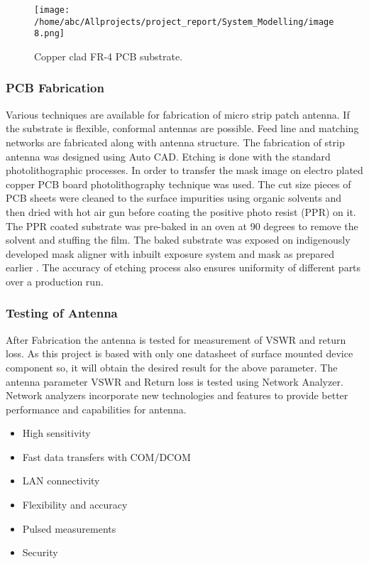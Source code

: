 \documentclass[12pt]{article}
\begin{document}
		            \begin{figure}[H]
		            	\centering
		            	\texttt{[image: /home/abc/Allprojects/project\_report/System\_Modelling/image8.png]}
		            	\caption{Copper clad FR-4 PCB substrate.}	             	
		            \end{figure}
		             		   
	
		        \subsubsection{PCB Fabrication}
		         \justify
		          Various techniques are available for fabrication of micro strip patch antenna. If the substrate is flexible, conformal antennas are possible. Feed line and matching networks are fabricated along with antenna structure. The fabrication of strip antenna was designed using Auto CAD. Etching is done with the standard photolithographic processes. In order to transfer the mask image on electro plated copper PCB board photolithography technique was used. The cut size pieces of PCB sheets were cleaned to the surface impurities using organic solvents and then dried with hot air gun before coating the positive photo resist (PPR) on it. The PPR coated substrate was pre-baked in an oven at 90 degrees to remove the solvent and stuffing the film. The baked substrate was exposed on indigenously developed mask aligner with inbuilt exposure system and mask as prepared earlier . The accuracy of etching process also ensures uniformity of different parts over a production run.
		          
		         \cleardoublepage
		         \subsubsection{ Testing of Antenna}
		          \justify 
		           After Fabrication the antenna is tested for measurement of VSWR and return loss. As this project is based with only one datasheet of surface mounted device component so, it will obtain the desired result for the above parameter. The antenna parameter VSWR and Return loss is tested using Network Analyzer. Network analyzers incorporate new technologies and features to provide better performance and capabilities for antenna. 
		           
		           \begin{itemize}
		           	\item High sensitivity
		           	\item Fast data transfers with COM/DCOM
		           	\item LAN connectivity
		           	\item Flexibility and accuracy
		           	\item Pulsed measurements
		           	\item Security
		           \end{itemize}
		          \cleardoublepage
\end{document}
